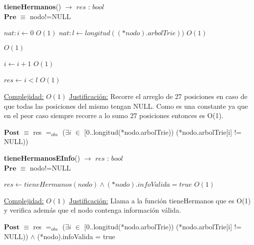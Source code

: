\begin{algorithm}[H]{\textbf{tieneHermanos}() $\to$ $res$ : $bool$}
	{\\ $\textbf{Pre}$ $\equiv$ nodo!=NULL}
	\begin{algorithmic}

		\State $nat: i \gets 0$ \Comment $O(1)$
		\State $nat: l \gets longitud((*nodo).arbolTrie))$ \Comment $O(1)$

		 \Comment $O(1)$

			\State $i \gets i + 1$ \Comment $O(1)$

		\EndWhile

		\State $res \gets i < l$ \Comment $O(1)$

		\medskip
		\Statex \underline{Complejidad:} $O(1)$
		\Statex \underline{Justificación:} Recorre el arreglo de 27 posiciones en caso de que todas las posiciones del mismo tengan NULL. Como es una constante ya que en el peor caso siempre recorre a lo sumo 27 posiciones entonces es O(1).

    \end{algorithmic}
    {$\textbf{Post}$ $\equiv$ res $=_{obs}$ ($\exists i$ $\in$ [0..longitud(*nodo.arbolTrie)) (*nodo.arbolTrie[i] != NULL))}
\end{algorithm}


\begin{algorithm}[H]{\textbf{tieneHermanosEInfo}() $\to$ $res$ : $bool$}
	{\\ $\textbf{Pre}$ $\equiv$ nodo!=NULL}
	\begin{algorithmic}

		\State $res \gets tieneHermanos(nodo) \land (*nodo).infoValida = true$ \Comment $O(1)$

		\medskip
		\Statex \underline{Complejidad:} $O(1)$
		\Statex \underline{Justificación:} Llama a la función tieneHermanos que es O(1) y verifica además que el nodo contenga información válida.

    \end{algorithmic}
    {$\textbf{Post}$ $\equiv$ res $=_{obs}$
($\exists i$ $\in$ [0..longitud(*nodo.arbolTrie))
(*nodo.arbolTrie[i] != NULL)) $\land$ (*nodo).infoValida = true}
\end{algorithm}
